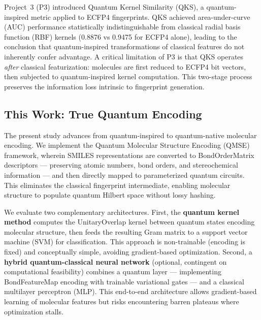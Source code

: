 Project~3 (P3)\cite{Sao2026P3QuantumInspired} introduced Quantum Kernel Similarity (QKS), a quantum-inspired metric applied to ECFP4 fingerprints. QKS achieved area-under-curve (AUC) performance statistically indistinguishable from classical radial basis function (RBF) kernels (0.8876 vs 0.9475 for ECFP4 alone), leading to the conclusion that quantum-inspired transformations of classical features do not inherently confer advantage. A critical limitation of P3 is that QKS operates \textit{after} classical featurization: molecules are first reduced to ECFP4 bit vectors, then subjected to quantum-inspired kernel computation. This two-stage process preserves the information loss intrinsic to fingerprint generation.

\subsection{This Work: True Quantum Encoding}

The present study advances from quantum-inspired to quantum-native molecular encoding. We implement the Quantum Molecular Structure Encoding (QMSE) framework,\cite{Boy2025QMSE} wherein SMILES representations are converted to BondOrderMatrix descriptors — preserving atomic numbers, bond orders, and stereochemical information — and then directly mapped to parameterized quantum circuits. This eliminates the classical fingerprint intermediate, enabling molecular structure to populate quantum Hilbert space without lossy hashing.

We evaluate two complementary architectures. First, the \textbf{quantum kernel method} computes the UnitaryOverlap kernel\cite{Havlicek2019QuantumKernel} between quantum states encoding molecular structure, then feeds the resulting Gram matrix to a support vector machine (SVM) for classification. This approach is non-trainable (encoding is fixed) and conceptually simple, avoiding gradient-based optimization. Second, a \textbf{hybrid quantum-classical neural network} (optional, contingent on computational feasibility) combines a quantum layer — implementing BondFeatureMap encoding with trainable variational gates\cite{Boy2025QMSE} — and a classical multilayer perceptron (MLP). This end-to-end architecture allows gradient-based learning of molecular features but risks encountering barren plateaus where optimization stalls.\cite{McClean2018Barren}

